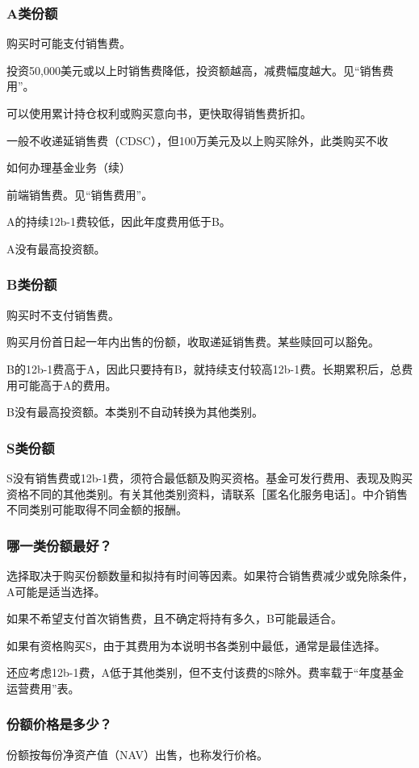 \documentclass[UTF8,fontset=none,11pt,a4paper]{ctexart}
\begin{document}
\subsubsection*{A类份额}
购买时可能支付销售费。

投资50,000美元或以上时销售费降低，投资额越高，减费幅度越大。见“销售费用”。

可以使用累计持仓权利或购买意向书，更快取得销售费折扣。

一般不收递延销售费（CDSC），但100万美元及以上购买除外，此类购买不收


\par{}\label{originalpage10}
如何办理基金业务（续）

前端销售费。见“销售费用”。

A的持续12b-1费较低，因此年度费用低于B。

A没有最高投资额。

\subsubsection*{B类份额}
购买时不支付销售费。

购买月份首日起一年内出售的份额，收取递延销售费。某些赎回可以豁免。

B的12b-1费高于A，因此只要持有B，就持续支付较高12b-1费。长期累积后，总费用可能高于A的费用。

B没有最高投资额。本类别不自动转换为其他类别。

\subsubsection*{S类份额}
S没有销售费或12b-1费，须符合最低额及购买资格。基金可发行费用、表现及购买资格不同的其他类别。有关其他类别资料，请联系［匿名化服务电话］。中介销售不同类别可能取得不同金额的报酬。

\subsubsection*{哪一类份额最好？}
选择取决于购买份额数量和拟持有时间等因素。如果符合销售费减少或免除条件，A可能是适当选择。

如果不希望支付首次销售费，且不确定将持有多久，B可能最适合。

如果有资格购买S，由于其费用为本说明书各类别中最低，通常是最佳选择。

还应考虑12b-1费，A低于其他类别，但不支付该费的S除外。费率载于“年度基金运营费用”表。

\subsubsection*{份额价格是多少？}
份额按每份净资产值（NAV）出售，也称发行价格。
\end{document}
